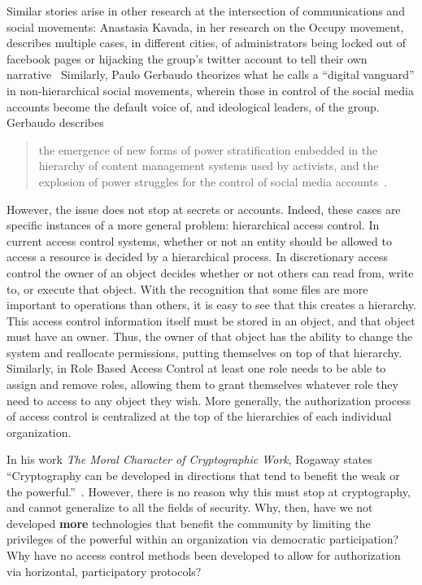 Similar stories arise in other research at the intersection of communications
and social movements: Anastasia Kavada, in her research on the Occupy movement,
describes multiple cases, in different cities, of administrators being locked
out of facebook pages or hijacking the group’s twitter account to tell their own
narrative~\cite{kavada2015creating} Similarly, Paulo Gerbaudo theorizes what he
calls a ``digital vanguard'' in non-hierarchical social movements, wherein those
in control of the social media accounts become the default voice of, and
ideological leaders, of the group. Gerbaudo describes 

\begin{quote}
the emergence of new forms of power stratification embedded in the hierarchy
of content management systems used by activists, and the explosion of power
struggles for the control of social media accounts~\cite{gerbaudo2017social}.
\end{quote}

However, the issue does not stop at secrets or accounts. Indeed, these cases are
specific instances of a more general problem: hierarchical access control. In
current access control systems, whether or not an entity should be allowed to
access a resource is decided by a hierarchical process. In discretionary access
control the owner of an object decides whether or not others can read from,
write to, or execute that object. With the recognition that some files are more
important to operations than others, it is easy to see that this creates a
hierarchy. This access control information itself must be stored in an object,
and that object must have an owner. Thus, the owner of that object has the
ability to change the system and reallocate permissions, putting themselves on
top of that hierarchy. Similarly, in Role Based Access Control at least one role
needs to be able to assign and remove roles, allowing them to grant themselves
whatever role they need to access to any object they wish. More generally, the
authorization process of access control is centralized at the top of the
hierarchies of each individual organization.

In his work \textit{The Moral Character of Cryptographic Work}, Rogaway states
``Cryptography can be developed in directions that tend to benefit the weak or
the powerful.''~\cite{rogaway2015moral}. However, there is no reason why this
must stop at cryptography, and cannot generalize to all the fields of security.
Why, then, have we not developed \textbf{more} technologies that benefit the
community by limiting the privileges of the powerful within an organization via
democratic participation? Why have no access control methods been developed to
allow for authorization via horizontal, participatory protocols?


